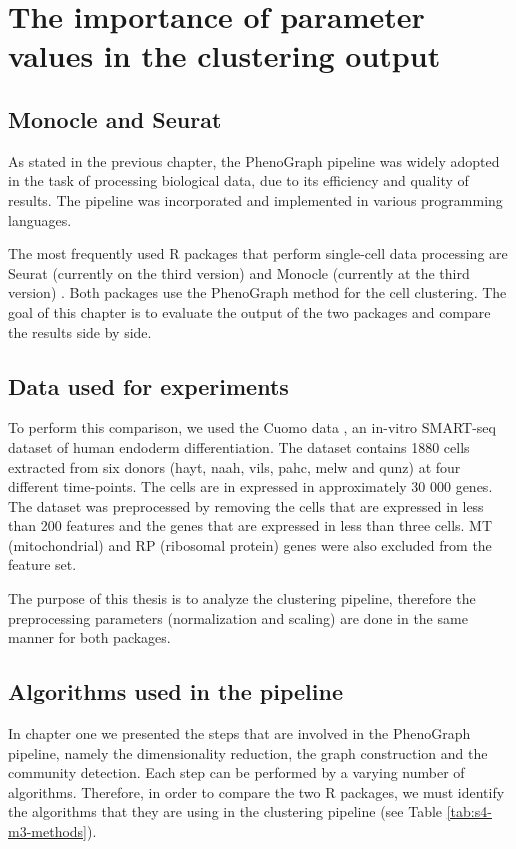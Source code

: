 \chapter{The importance of parameter values in the clustering output}

\section{Monocle and Seurat}
As stated in the previous chapter, the PhenoGraph pipeline was widely adopted in the task of processing biological data, due to its efficiency and quality of results. The pipeline was incorporated and implemented in various programming languages.

The most frequently used R packages that perform single-cell data processing are Seurat (currently on the third version) \cite{Hao2021} and Monocle (currently at the third version) \cite{Cao2019}. Both packages use the PhenoGraph method for the cell clustering. The goal of this chapter is to evaluate the output of the two packages and compare the results side by side.

\section{Data used for experiments}
To perform this comparison, we used the Cuomo data \cite{Cuomo2020}, an in-vitro SMART-seq dataset of human endoderm differentiation. The dataset contains 1880 cells extracted from six donors (hayt, naah, vils, pahc, melw and qunz) at four different time-points. The cells are in expressed in approximately 30 000 genes. The dataset was preprocessed by removing the cells that are expressed in less than 200 features and the genes that are expressed in less than three cells. MT (mitochondrial) and RP (ribosomal protein) genes were also excluded from the feature set.

The purpose of this thesis is to analyze the clustering pipeline, therefore the preprocessing parameters (normalization and scaling) are done in the same manner for both packages.

\section{Algorithms used in the pipeline}
In chapter one we presented the steps that are involved in the PhenoGraph pipeline, namely the dimensionality reduction, the graph construction and the community detection. Each step can be performed by a varying number of algorithms. Therefore, in order to compare the two R packages, we must identify the algorithms that they are using in the clustering pipeline (see Table \ref{tab:s4-m3-methods}).

